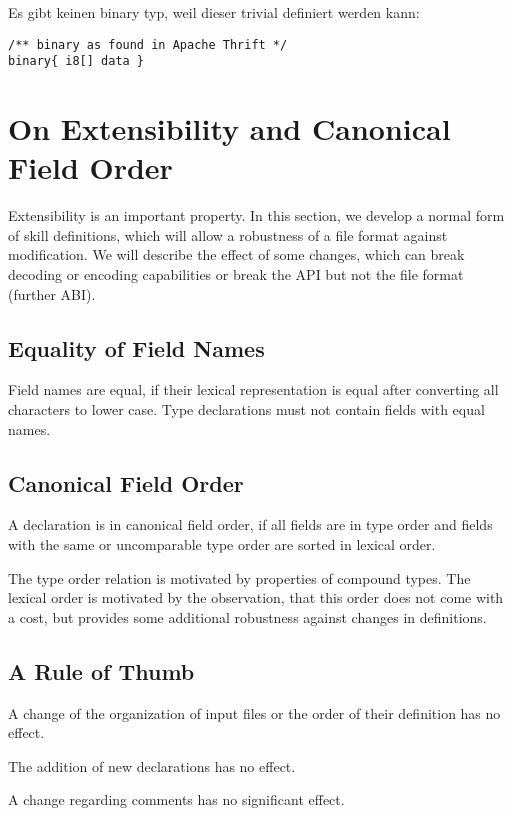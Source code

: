 \documentclass[a4paper,10pt]{article}
\begin{document}
Es gibt keinen binary typ, weil dieser trivial definiert werden kann:
\begin{verbatim}
/** binary as found in Apache Thrift */
binary{ i8[] data }
\end{verbatim}


\section{On Extensibility and Canonical Field Order}

Extensibility is an important property. In this section, we develop a normal form of skill definitions, which will allow a robustness of a file format against modification. We will describe the effect of some changes, which can break decoding or encoding capabilities or break the API but not the file format (further ABI).

\subsection{Equality of Field Names}

Field names are equal, if their lexical representation is equal after converting all characters to lower case. Type declarations must not contain fields with equal names.

\subsection{Canonical Field Order}

A declaration is in canonical field order, if all fields are in type order and fields with the same or uncomparable type order are sorted in lexical order.

The type order relation is motivated by properties of compound types. The lexical order is motivated by the observation, that this order does not come with a cost, but provides some additional robustness against changes in definitions.

\subsection{A Rule of Thumb}

A change of the organization of input files or the order of their definition has no effect.

The addition of new declarations has no effect.

A change regarding comments has no significant effect.
\end{document}
